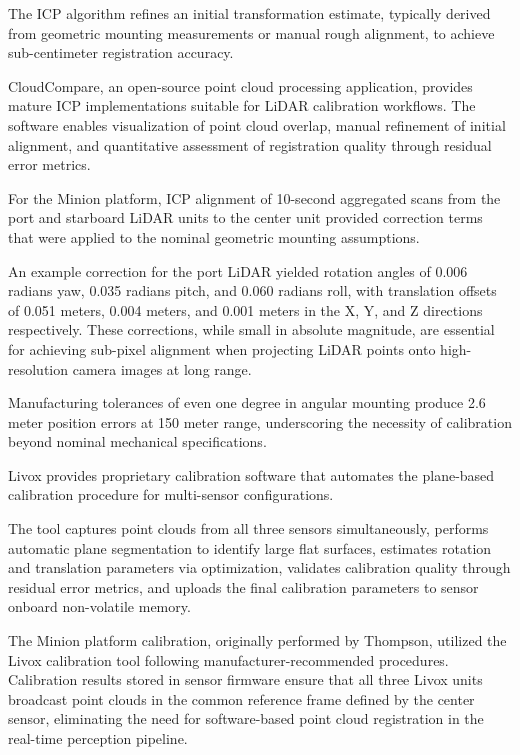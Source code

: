 The ICP algorithm refines an initial transformation estimate, typically derived from geometric mounting measurements or manual rough alignment, to achieve sub-centimeter registration accuracy.

CloudCompare, an open-source point cloud processing application, provides mature ICP implementations suitable for LiDAR calibration workflows.
The software enables visualization of point cloud overlap, manual refinement of initial alignment, and quantitative assessment of registration quality through residual error metrics.

For the Minion platform, ICP alignment of 10-second aggregated scans from the port and starboard LiDAR units to the center unit provided correction terms that were applied to the nominal geometric mounting assumptions.

An example correction for the port LiDAR yielded rotation angles of 0.006 radians yaw, 0.035 radians pitch, and 0.060 radians roll, with translation offsets of 0.051 meters, 0.004 meters, and 0.001 meters in the X, Y, and Z directions respectively.
These corrections, while small in absolute magnitude, are essential for achieving sub-pixel alignment when projecting LiDAR points onto high-resolution camera images at long range.

Manufacturing tolerances of even one degree in angular mounting produce 2.6 meter position errors at 150 meter range, underscoring the necessity of calibration beyond nominal mechanical specifications.


Livox provides proprietary calibration software that automates the plane-based calibration procedure for multi-sensor configurations.

The tool captures point clouds from all three sensors simultaneously, performs automatic plane segmentation to identify large flat surfaces, estimates rotation and translation parameters via optimization, validates calibration quality through residual error metrics, and uploads the final calibration parameters to sensor onboard non-volatile memory.

The Minion platform calibration, originally performed by Thompson, utilized the Livox calibration tool following manufacturer-recommended procedures.
Calibration results stored in sensor firmware ensure that all three Livox units broadcast point clouds in the common reference frame defined by the center sensor, eliminating the need for software-based point cloud registration in the real-time perception pipeline.

